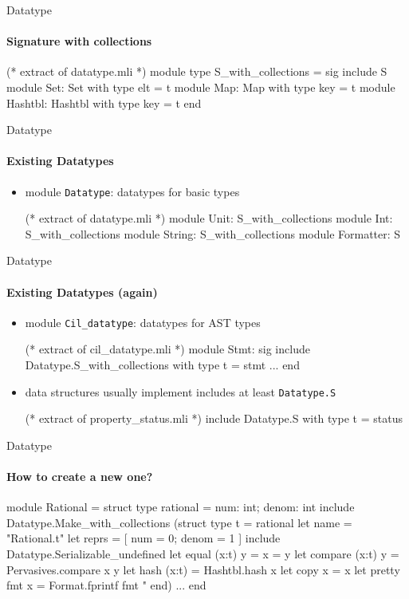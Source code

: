 \begin{frame}[fragile]{Datatype}
  \framesubtitle{Signature with collections}

\begin{ocamlcode}
(* extract of datatype.mli *)
module type S_with_collections = sig
  include S
  module Set: Set with type elt = t
  module Map: Map with type key = t
  module Hashtbl: Hashtbl with type key = t
end
\end{ocamlcode}  
\end{frame}

\begin{frame}[fragile]{Datatype}
  \framesubtitle{Existing Datatypes}

  \begin{itemize}
  \item module \lstinline+Datatype+: datatypes for basic \ocaml types
\begin{ocamlcode}
(* extract of datatype.mli *)
module Unit: S_with_collections
module Int: S_with_collections
module String: S_with_collections
module Formatter: S
\end{ocamlcode}
  \end{itemize}
\end{frame}

\begin{frame}[fragile]{Datatype}
  \framesubtitle{Existing Datatypes (again)}

  \begin{itemize}
  \item module \lstinline+Cil_datatype+: datatypes for AST types
\begin{ocamlcode}
(* extract of cil_datatype.mli *)
module Stmt: sig
  include Datatype.S_with_collections
    with type t = stmt
  ...
end
\end{ocamlcode}
\item \framac data structures usually implement includes at least
  \lstinline+Datatype.S+
\begin{ocamlcode}
(* extract of property_status.mli *)
include Datatype.S with type t = status
\end{ocamlcode}
  \end{itemize}

\end{frame}

\begin{frame}[fragile]{Datatype}
  \framesubtitle{How to create a new one?}
\small
\begin{ocamlcode}
module Rational = struct
  type rational = { num: int; denom: int }
  include Datatype.Make_with_collections
    (struct
       type t = rational
       let name = "Rational.t"
       let reprs = [ { num = 0; denom = 1 } ]
       include Datatype.Serializable_undefined
       let equal (x:t) y = x = y
       let compare (x:t) y = Pervasives.compare x y
       let hash (x:t) = Hashtbl.hash x
       let copy x = x
       let pretty fmt x = 
         Format.fprintf fmt "%
     end)
  ...
end
\end{ocamlcode}
\end{frame}

